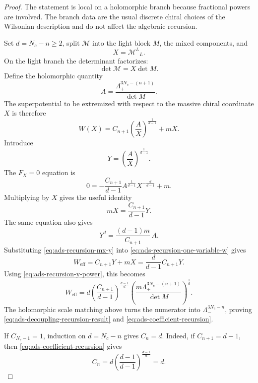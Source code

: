\begin{proof}
The statement is local on a holomorphic branch because fractional powers are
involved.  The branch data are the usual discrete chiral choices of the
Wilsonian description and do not affect the algebraic recursion.

Set \(d=N_c-n\geq2\), split \(\mathcal M\) into the light block \(M\), the
mixed components, and
\[
  X=\mathcal M^L{}_L .
\]
On the light branch the determinant factorizes:
\[
  \det\mathcal M=X\det M .
\]
Define the holomorphic quantity
\[
  A=\frac{\Lambda_{+}^{3N_c-(n+1)}}{\det M}.
\]
The superpotential to be extremized with respect to the massive chiral
coordinate \(X\) is therefore
\begin{equation}
  W(X)
  =
  C_{n+1}\left(\frac{A}{X}\right)^{\frac1{d-1}}
  +mX .
  \label{eq:ads-recursion-one-variable-w}
\end{equation}
Introduce
\[
  Y=\left(\frac{A}{X}\right)^{\frac1{d-1}} .
\]
The \(F_X=0\) equation is
\[
  0
  =
  -\frac{C_{n+1}}{d-1}
  A^{\frac1{d-1}}X^{-\frac{d}{d-1}}
  +m .
\]
Multiplying by \(X\) gives the useful identity
\begin{equation}
  mX=\frac{C_{n+1}}{d-1}Y .
  \label{eq:ads-recursion-mx-y}
\end{equation}
The same equation also gives
\begin{equation}
  Y^d
  =
  \frac{(d-1)m}{C_{n+1}}\,A .
  \label{eq:ads-recursion-y-power}
\end{equation}
Substituting \eqref{eq:ads-recursion-mx-y} into
\eqref{eq:ads-recursion-one-variable-w} gives
\[
  W_{\mathrm{eff}}
  =
  C_{n+1}Y+mX
  =
  \frac{d}{d-1}C_{n+1}Y .
\]
Using \eqref{eq:ads-recursion-y-power}, this becomes
\[
  W_{\mathrm{eff}}
  =
  d\left(\frac{C_{n+1}}{d-1}\right)^{\frac{d-1}{d}}
  \left(
    \frac{m\Lambda_{+}^{3N_c-(n+1)}}{\det M}
  \right)^{\frac1d}.
\]
The holomorphic scale matching above turns the numerator into
\(\Lambda_-^{3N_c-n}\), proving
\eqref{eq:ads-decoupling-recursion-result} and
\eqref{eq:ads-coefficient-recursion}.

If \(C_{N_c-1}=1\), induction on \(d=N_c-n\) gives \(C_n=d\).  Indeed, if
\(C_{n+1}=d-1\), then \eqref{eq:ads-coefficient-recursion} gives
\[
  C_n
  =
  d\left(\frac{d-1}{d-1}\right)^{\frac{d-1}{d}}
  =
  d .
\]
\end{proof}

